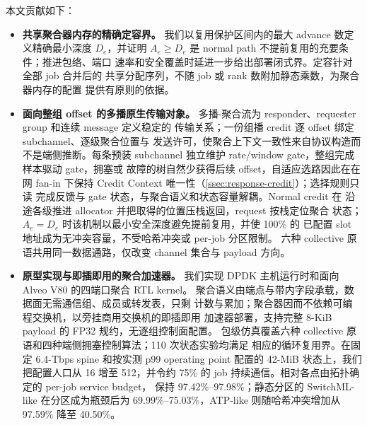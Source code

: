 本文贡献如下：

\begin{itemize}
    \item \textbf{共享聚合器内存的精确定容界。}
    我们以复用保护区间内的最大 advance 数定义精确最小深度 $D_e$，并证明
    $A_e\geq D_e$ 是 normal path 不提前复用的充要条件；推进包络、端口
    速率和安全覆盖时延进一步给出部署闭式界。定容针对全部 job 合并后的
    共享分配序列，不随 job 或 rank 数附加静态乘数，为聚合器内存的配置
    提供有原则的依据。

    \item \textbf{面向整组 offset 的多播原生传输对象。}
    多播-聚合流为 responder、requester group 和连续 message 定义稳定的
    传输关系；一份组播 credit 逐 offset 绑定 subchannel、逐级聚合位置与
    发送许可，使聚合上下文一致性来自协议构造而不是端侧推断。每条预装
    subchannel 独立维护 rate/window gate，整组完成样本驱动 gate，拥塞或
    故障的树自然少获得后续 offset，自适应选路因此在在网 fan-in 下保持
    Credit Context 唯一性（\cref{ssec:response-credit}）；选择规则只读
    完成反馈与 gate 状态，与聚合语义和状态容量解耦。Normal credit 在
    沿途各级推进 allocator 并把取得的位置压栈返回，request 按栈定位聚合
    状态；$A_e=D_e$ 时该机制以最小安全深度避免提前复用，并使 100\% 的
    已配置 slot 地址成为无冲突容量，不受哈希冲突或 per-job 分区限制。
    六种 collective 原语共用同一数据通路，仅改变 channel 集合与 payload
    方向。

    \item \textbf{原型实现与即插即用的聚合加速器。}
    我们实现 DPDK 主机运行时和面向 Alveo V80 的四端口聚合 RTL kernel。
    聚合语义由端点与带内字段承载，数据面无需通信组、成员或转发表，只剩
    计数与累加；聚合器因而不依赖可编程交换机，以旁挂商用交换机的即插即用
    加速器部署，支持完整 8-KiB payload 的 FP32 规约，无逐组控制面配置。
    包级仿真覆盖六种 collective 原语和四种端侧拥塞控制算法；110 次状态实验均满足
    相应的循环复用界。在固定 6.4-Tbps spine 和按实测 p99 operating point
    配置的 42-MiB 状态上，我们把配置人口从 16 增至 512，并令约 75\% 的
    job 持续通信。相对各点由拓扑确定的 per-job service budget，\sysname
    保持 97.42\%--97.98\%；静态分区的 SwitchML-like 在分区成为瓶颈后为
    69.99\%--75.03\%，ATP-like 则随哈希冲突增加从 97.59\% 降至 40.50\%。
\end{itemize}
